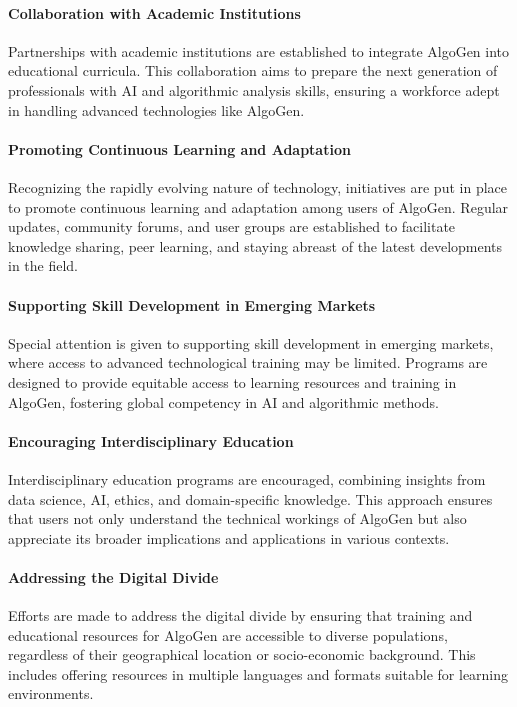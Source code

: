 \documentclass{article}
\begin{document}
\paragraph{Collaboration with Academic Institutions}
Partnerships with academic institutions are established to integrate AlgoGen into educational curricula. This collaboration aims to prepare the next generation of professionals with AI and algorithmic analysis skills, ensuring a workforce adept in handling advanced technologies like AlgoGen.

\paragraph{Promoting Continuous Learning and Adaptation}
Recognizing the rapidly evolving nature of technology, initiatives are put in place to promote continuous learning and adaptation among users of AlgoGen. Regular updates, community forums, and user groups are established to facilitate knowledge sharing, peer learning, and staying abreast of the latest developments in the field.

\paragraph{Supporting Skill Development in Emerging Markets}
Special attention is given to supporting skill development in emerging markets, where access to advanced technological training may be limited. Programs are designed to provide equitable access to learning resources and training in AlgoGen, fostering global competency in AI and algorithmic methods.

\paragraph{Encouraging Interdisciplinary Education}
Interdisciplinary education programs are encouraged, combining insights from data science, AI, ethics, and domain-specific knowledge. This approach ensures that users not only understand the technical workings of AlgoGen but also appreciate its broader implications and applications in various contexts.

\paragraph{Addressing the Digital Divide}
Efforts are made to address the digital divide by ensuring that training and educational resources for AlgoGen are accessible to diverse populations, regardless of their geographical location or socio-economic background. This includes offering resources in multiple languages and formats suitable for learning environments.
\end{document}
